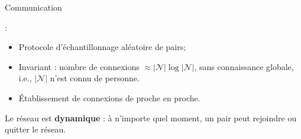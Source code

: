 \begin{frame}{Communication}{\SPRAY}

  \SPRAY :
  \begin{itemize}
  \item Protocole d'échantillonnage aléatoire de pairs;
    \vspace{0.25cm}
  \item Invariant : nombre de connexions
    $\approx |\mathcal{N}| \log |\mathcal{N}|$, sans connaissance globale, i.e.,
    $|\mathcal{N}|$ n'est connu de personne.
    \vspace{0.25cm}
  \item Établissement de connexions de proche en proche.
  \end{itemize}
    
  \vspace{1cm}


  Le réseau est \textbf{dynamique} : à n'importe quel moment, un pair peut
  rejoindre ou quitter le réseau. \\
  


  \vspace{1cm}

  \begin{minipage}{0.32\textwidth}
    \begin{center}
      
    \end{center}
  \end{minipage}
  \begin{minipage}{0.32\textwidth}
    \begin{center}
      \\
    \end{center}
  \end{minipage}
  \begin{minipage}{0.32\textwidth}
    \begin{center}
      
    \end{center}
  \end{minipage}

  \vspace{0.15cm}


\end{frame}
